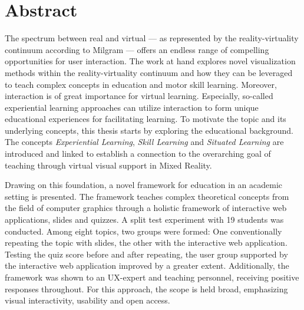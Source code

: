 %





\chapter*{Abstract}
\label{sec:abstract}
\vspace*{-10mm}

The spectrum between real and virtual --- as represented by the reality-virtuality continuum according to Milgram --- offers an endless range of compelling opportunities for user interaction.
The work at hand explores novel visualization methods within the reality-virtuality continuum and how they can be leveraged to teach complex concepts in education and motor skill learning.
Moreover, interaction is of great importance for virtual learning.
Especially, so-called experiential learning approaches can utilize interaction to form unique educational experiences for facilitating learning.
To motivate the topic and its underlying concepts, this thesis starts by exploring the educational background.
The concepts \emph{Experiential Learning}, \emph{Skill Learning} and \emph{Situated Learning} are introduced and linked to establish a connection to the overarching goal of teaching through virtual visual support in Mixed Reality.

Drawing on this foundation, a novel framework for education in an academic setting is presented.
The framework teaches complex theoretical concepts from the field of computer graphics through a holistic framework of interactive web applications, slides and quizzes.
A split test experiment with 19 students was conducted.
Among eight topics, two groups were formed: One conventionally repeating the topic with slides, the other with the interactive web application.
Testing the quiz score before and after repeating, the user group supported by the interactive web application improved by a greater extent.
Additionally, the framework was shown to an UX-expert and teaching personnel, receiving positive responses throughout.
For this approach, the scope is held broad, emphasizing visual interactivity, usability and open access.

